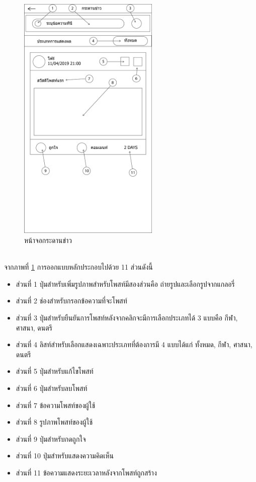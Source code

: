 		\begin{figure}[H]
			\centering
			\includegraphics[width=0.6\textwidth]{Figures/3/UI/board}
			\caption{หน้าจอกระดานข่าว}
			\label{Fig:กระดานข่าว}
		\end{figure} \\

		จากภาพที่ \ref{Fig:กระดานข่าว} การออกแบบหลักประกอบไปด้วย 11 ส่วนดังนี้
		
		\begin{itemize}
			\item ส่วนที่ 1 ปุ่มสำหรับเพิ่มรูปภาพสำหรับโพสท์มีสองส่วนคือ ถ่ายรูปและเลือกรูปจากแกลอรี่
			\item ส่วนที่ 2 ช่องสำหรับกรอกข้อความที่จะโพสท์
			\item ส่วนที่ 3 ปุ่มสำหรับยืนยันการโพสท์หลังจากคลิกจะมีการเลือกประเภทได้ 3 แบบคือ กีฬา, ศาสนา, ดนตรี
			\item ส่วนที่ 4 ลิสท์สำหรับเลือกแสดงเฉพาะประเภทที่ต้องการมี 4 แบบได้แก่ ทั้งหมด, กีฬา, ศาสนา, ดนตรี
			\item ส่วนที่ 5 ปุ่มสำหรับแก้ไขโพสท์
			\item ส่วนที่ 6 ปุ่มสำหรับลบโพสท์
			\item ส่วนที่ 7 ข้อความโพสท์ของผู้ใช้
			\item ส่วนที่ 8 รูปภาพโพสท์ของผู้ใช้
			\item ส่วนที่ 9 ปุ่มสำหรับกดถูกใจ
			\item ส่วนที่ 10 ปุ่มสำหรับแสดงความคิดเห็น
			\item ส่วนที่ 11 ข้อความแสดงระยะเวลาหลังจากโพสท์ถูกสร้าง
		\end{itemize}

